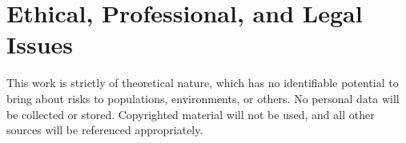 \section{Ethical, Professional, and Legal Issues}
\label{section: ethics}

This work is strictly of theoretical nature, which has no identifiable potential to bring about risks to populations, environments, or others. No personal data will be collected or stored. Copyrighted material will not be used, and all other sources will be referenced appropriately.

